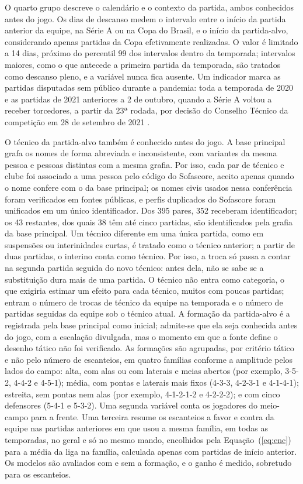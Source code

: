 O quarto grupo descreve o calendário e o contexto da partida, ambos conhecidos antes do jogo. Os dias de descanso medem o intervalo entre o início da partida anterior da equipe, na Série A ou na Copa do Brasil, e o início da partida-alvo, considerando apenas partidas da Copa efetivamente realizadas. O valor é limitado a 14 dias, próximo do percentil 99 dos intervalos dentro da temporada; intervalos maiores, como o que antecede a primeira partida da temporada, são tratados como descanso pleno, e a variável nunca fica ausente. Um indicador marca as partidas disputadas sem público durante a pandemia: toda a temporada de 2020 e as partidas de 2021 anteriores a 2 de outubro, quando a Série A voltou a receber torcedores, a partir da 23ª rodada, por decisão do Conselho Técnico da competição em 28 de setembro de 2021 \cite{opovoPublico2021}.

O técnico da partida-alvo também é conhecido antes do jogo. A base principal grafa os nomes de forma abreviada e inconsistente, com variantes da mesma pessoa e pessoas distintas com a mesma grafia. Por isso, cada par de técnico e clube foi associado a uma pessoa pelo código do Sofascore, aceito apenas quando o nome confere com o da base principal; os nomes civis usados nessa conferência foram verificados em fontes públicas, e perfis duplicados do Sofascore foram unificados em um único identificador. Dos 395 pares, 352 receberam identificador; os 43 restantes, dos quais 38 têm até cinco partidas, são identificados pela grafia da base principal. Um técnico diferente em uma única partida, como em suspensões ou interinidades curtas, é tratado como o técnico anterior; a partir de duas partidas, o interino conta como técnico. Por isso, a troca só passa a contar na segunda partida seguida do novo técnico: antes dela, não se sabe se a substituição dura mais de uma partida. O técnico não entra como categoria, o que exigiria estimar um efeito para cada técnico, muitos com poucas partidas; entram o número de trocas de técnico da equipe na temporada e o número de partidas seguidas da equipe sob o técnico atual. A formação da partida-alvo é a registrada pela base principal como inicial; admite-se que ela seja conhecida antes do jogo, com a escalação divulgada, mas o momento em que a fonte define o desenho tático não foi verificado. As formações são agrupadas, por critério tático e não pelo número de escanteios, em quatro famílias conforme a amplitude pelos lados do campo: alta, com alas ou com laterais e meias abertos (por exemplo, 3-5-2, 4-4-2 e 4-5-1); média, com pontas e laterais mais fixos (4-3-3, 4-2-3-1 e 4-1-4-1); estreita, sem pontas nem alas (por exemplo, 4-1-2-1-2 e 4-2-2-2); e com cinco defensores (5-4-1 e 5-3-2). Uma segunda variável conta os jogadores do meio-campo para a frente. Uma terceira resume os escanteios a favor e contra da equipe nas partidas anteriores em que usou a mesma família, em todas as temporadas, no geral e só no mesmo mando, encolhidos pela Equação~(\ref{eq:enc}) para a média da liga na família, calculada apenas com partidas de início anterior. Os modelos são avaliados com e sem a formação, e o ganho é medido, sobretudo para os escanteios.

